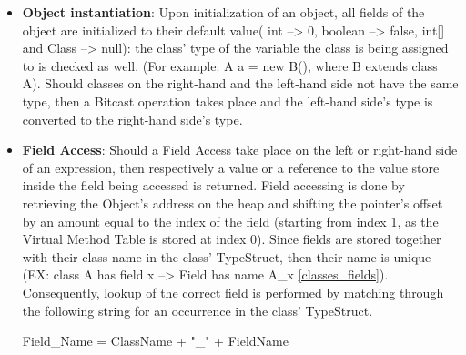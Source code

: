 \documentclass[paper=a4, fontsize=11pt]{scrartcl}
\numberwithin{equation}{section}		%
\numberwithin{figure}{section}			%
\numberwithin{table}{section}				%
\begin{document}
\begin{itemize}
\begin{figure}[h]
	\end{figure}
	
		\item \textbf{Object instantiation}:  Upon initialization of an object, all fields of the object are initialized to their default value( int --> 0, boolean --> false, int[] and Class --> null): the class' type of the variable the class is being assigned to is checked as well. (For example: A a = new B(), where B extends class A). Should classes on the right-hand and the left-hand side not have the same type, then a Bitcast operation takes place and the left-hand side's type is converted to the right-hand side's type. 

	\item \textbf{Field Access}: Should a Field Access take place on the left or right-hand side of an expression, then respectively a value or a reference to the value store inside the field being accessed is returned. Field accessing is done by retrieving the Object's address on the heap and shifting the pointer's offset by an amount equal to the index of the field (starting from index 1, as the Virtual Method Table is stored at index 0). Since fields are stored together with their class name in the class' TypeStruct, then their name is unique (EX: class A has field x --> Field has name A\_x \ref{classes_fields}). Consequently, lookup of the correct field is performed by matching through the following string for an occurrence in the class' TypeStruct.
	\begin{center}
Field\_Name = ClassName + "\_" + FieldName
\end{center}	
	

	
\end{itemize}
\end{document}
